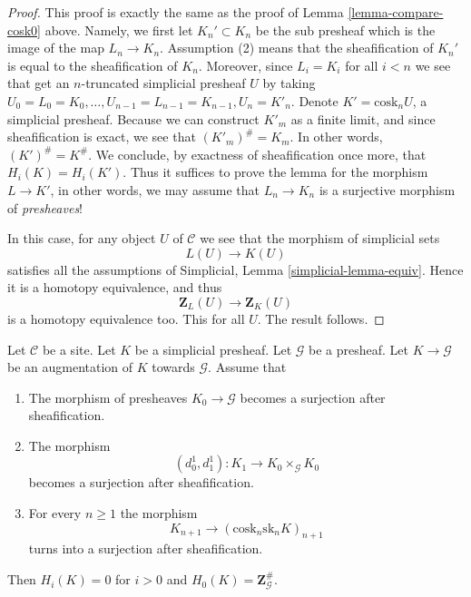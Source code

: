 \begin{proof}
This proof is exactly the same as the proof of
Lemma \ref{lemma-compare-cosk0} above. Namely,
we first let $K_n' \subset K_n$ be the sub presheaf
which is the image of the map $L_n \to K_n$. Assumption
(2) means that the sheafification of $K_n'$ is equal to
the sheafification of $K_n$. Moreover, since $L_i = K_i$
for all $i < n$ we see that get an $n$-truncated
simplicial presheaf $U$ by taking
$U_0 = L_0 = K_0, \ldots, U_{n - 1} = L_{n - 1} = K_{n - 1}, U_n = K'_n$.
Denote $K' = \text{cosk}_n U$, a simplicial presheaf.
Because we can construct $K'_m$ as a finite limit, and
since sheafification is exact, we see that
$(K'_m)^\# = K_m$. In other words, $(K')^\# = K^\#$.
We conclude, by exactness of sheafification once more,
that $H_i(K) = H_i(K')$. Thus it suffices to prove the lemma
for the morphism $L \to K'$, in other words, we may
assume that $L_n \to K_n$ is a surjective morphism
of {\it presheaves}!

\medskip\noindent
In this case, for any object $U$ of $\mathcal{C}$ we
see that the morphism of simplicial sets
$$
L(U) \longrightarrow K(U)
$$
satisfies all the assumptions of
Simplicial, Lemma \ref{simplicial-lemma-equiv}.
Hence it is a homotopy equivalence, and
thus
$$
\mathbf{Z}_L(U) \longrightarrow \mathbf{Z}_K(U)
$$
is a homotopy equivalence too. This for all $U$.
The result follows.
\end{proof}

\begin{lemma}
\label{lemma-acyclic-hypercover-sheaves}
Let $\mathcal{C}$ be a site.
Let $K$ be a simplicial presheaf.
Let $\mathcal{G}$ be a presheaf.
Let $K \to \mathcal{G}$ be an augmentation of $K$
towards $\mathcal{G}$. Assume that
\begin{enumerate}
\item The morphism of presheaves $K_0 \to \mathcal{G}$ becomes
a surjection after sheafification.
\item The morphism
$$
(d^1_0, d^1_1) :
K_1
\longrightarrow
K_0 \times_{\mathcal{G}} K_0
$$
becomes a surjection after sheafification.
\item For every $n \geq 1$ the morphism
$$
K_{n + 1} \longrightarrow (\text{cosk}_n \text{sk}_n K)_{n + 1}
$$
turns into a surjection after sheafification.
\end{enumerate}
Then $H_i(K) = 0$ for $i > 0$ and
$H_0(K) = \mathbf{Z}_\mathcal{G}^\#$.
\end{lemma}

